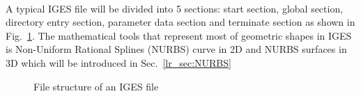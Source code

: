 \paragraph{}
A typical IGES file will be divided into 5 sections: start section, global section, directory entry section, parameter data section and terminate section as shown in Fig.~\ref{lr_fig:iges_data_form}.
The mathematical tools that represent most of geometric shapes in IGES is Non-Uniform Rational Splines (NURBS) curve in 2D and NURBS surfaces in 3D which will be introduced in Sec.~\ref{lr_sec:NURBS}

%
\begin{figure}[!ht]
    \centering
    \caption{File structure of an IGES file}
    \label{lr_fig:iges_data_form}
\end{figure}

\paragraph{}

